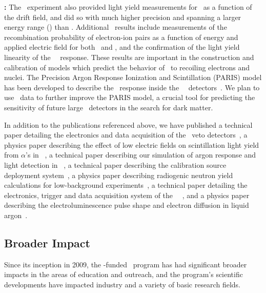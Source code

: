 \begin{compactitem}
\item {\bf \ARIS:} The \ARIS\ experiment also provided light yield measurements for \NRs\ as a function of the drift field, and did so with much higher precision and spanning a larger energy range (\ARISRecoilsLightEnergyRange) than \SCENE.  Additional \ARIS\ results include measurements of the recombination probability of electron-ion pairs as a function of energy and applied electric field for both \ERs\ and \NRs, and the confirmation of the light yield linearity of the \LAr\ \ER\ response. These results are important in the construction and calibration of models which predict the behavior of \LAr\ to recoiling electrons and nuclei. The Precision Argon Response Ionization and Scintillation (PARIS) model has been developed to describe the \LAr\ response inside the \DS\ \LArTPC\ detectors~\cite{Agnes:2017cz}. We plan to use \ARIS\ data to further improve the PARIS model, a crucial tool for predicting the sensitivity of future large \LAr\ detectors in the search for dark matter.

\end{compactitem}

In addition to the publications referenced above, we have published a technical paper detailing the electronics and data acquisition of the \DSfs\ veto detectors~\cite{Agnes:2016cp}, a physics paper describing the effect of low electric fields on scintillation light yield from $\alpha$'s in \LAr~\cite{Agnes:2017cl}, a technical paper describing our simulation of argon response and light detection in \DSfs~\cite{Agnes:2017cz}, a technical paper describing the calibration source deployment system~\cite{Agnes:2017ec}, a physics paper describing radiogenic neutron yield calculations for low-background experiments~\cite{Westerdale:2017vr}, a technical paper detailing the electronics, trigger and data acquisition system of the \DSfs\ \LArTPC~\cite{Agnes:2017ck}, and a physics paper describing the electroluminescence pulse shape and electron diffusion in liquid argon~\cite{Agnes:2018dt}.

\subsection{Broader Impact}
\label{sec:PreviousResults-BroaderImpact}

Since its inception in 2009, the \NSF-funded \DSs\ program has had significant broader impacts in the areas of education and outreach, and the program's scientific developments have impacted industry and a variety of basic research fields.

